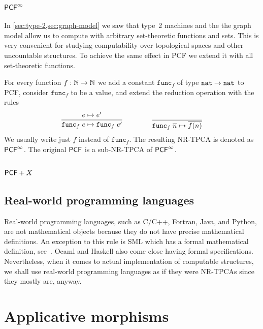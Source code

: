 \subsubsection[\texorpdfstring{$\PCFinf$}{PCF-infinity}]{$\PCFinf$}

In \cref{sec:type-2,sec:graph-model} we saw that
type~2 machines and the the graph model allow us to compute with
arbitrary set-theoretic functions and sets. This is very convenient
for studying computability over topological spaces and other
uncountable structures. To achieve the same effect in PCF we extend it
with all set-theoretic functions.

For every function $f : \mathbb{N} \to \mathbb{N}$ we add a constant $\mathtt{func}_f$
of type $\mathtt{nat} \to \mathtt{nat}$ to PCF, consider $\mathtt{func}_f$ to be a
value, and extend the reduction operation with the rules
%
\begin{equation*}
  \begin{gathered}\dfrac{e \mapsto e'}{\mathtt{func}_f\;e \mapsto \mathtt{func}_f\;e'}\end{gathered}
  \qquad\qquad
  \dfrac{}{\mathtt{func}_f\;\overline{n} \mapsto \overline{f(n)}}
\end{equation*}
%
We usually write just $f$ instead of $\mathtt{func}_f$. The resulting
NR-TPCA is denoted as $\PCFinf$. The original $\mathsf{PCF}$ is a sub-NR-TPCA
of $\PCFinf$.

\subsubsection[\texorpdfstring{$\PCF + X$}{PCF + X}]{$\PCF + X$}
\label{sec:pcf-x}


\subsection{Real-world programming languages}
\label{sec:programming-languages}

Real-world programming languages, such as C/C++, Fortran, Java, and
Python, are not mathematical objects because they do not have precise
mathematical definitions. An exception to this rule is SML which has a
formal mathematical definition, see~. Ocaml and
Haskell also come close having formal specifications. Nevertheless,
when it comes to actual implementation of computable structures, we
shall use real-world programming languages as if they were NR-TPCAs
since they mostly are, anyway.


\section{Applicative morphisms}
\label{sec:appl-morph}




